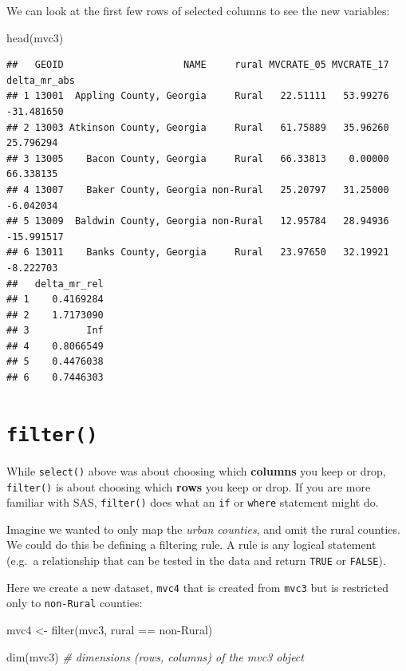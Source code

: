 \documentclass[
]{book}
\newenvironment{Shaded}{\begin{snugshade}}{\end{snugshade}}
\newcommand{\CommentTok}[1]{\textcolor[rgb]{0.56,0.35,0.01}{\textit{#1}}}
\newcommand{\FunctionTok}[1]{\textcolor[rgb]{0.00,0.00,0.00}{#1}}
\newcommand{\NormalTok}[1]{#1}
\newcommand{\OtherTok}[1]{\textcolor[rgb]{0.56,0.35,0.01}{#1}}
\newcommand{\SpecialCharTok}[1]{\textcolor[rgb]{0.00,0.00,0.00}{#1}}
\newcommand{\StringTok}[1]{\textcolor[rgb]{0.31,0.60,0.02}{#1}}
\begin{document}
We can look at the first few rows of selected columns to see the new variables:

\begin{Shaded}
\begin{Highlighting}[]
\FunctionTok{head}\NormalTok{(mvc3)}
\end{Highlighting}
\end{Shaded}

\begin{verbatim}
##   GEOID                     NAME     rural MVCRATE_05 MVCRATE_17 delta_mr_abs
## 1 13001  Appling County, Georgia     Rural   22.51111   53.99276   -31.481650
## 2 13003 Atkinson County, Georgia     Rural   61.75889   35.96260    25.796294
## 3 13005    Bacon County, Georgia     Rural   66.33813    0.00000    66.338135
## 4 13007    Baker County, Georgia non-Rural   25.20797   31.25000    -6.042034
## 5 13009  Baldwin County, Georgia non-Rural   12.95784   28.94936   -15.991517
## 6 13011    Banks County, Georgia     Rural   23.97650   32.19921    -8.222703
##   delta_mr_rel
## 1    0.4169284
## 2    1.7173090
## 3          Inf
## 4    0.8066549
## 5    0.4476038
## 6    0.7446303
\end{verbatim}

\hypertarget{filter}{%
\section{\texorpdfstring{\texttt{filter()}}{filter()}}\label{filter}}

While \texttt{select()} above was about choosing which \textbf{columns} you keep or drop, \texttt{filter()} is about choosing which \textbf{rows} you keep or drop. If you are more familiar with SAS, \texttt{filter()} does what an \texttt{if} or \texttt{where} statement might do.

Imagine we wanted to only map the \emph{urban counties}, and omit the rural counties. We could do this be defining a filtering rule. A rule is any logical statement (e.g.~a relationship that can be tested in the data and return \texttt{TRUE} or \texttt{FALSE}).

Here we create a new dataset, \texttt{mvc4} that is created from \texttt{mvc3} but is restricted only to \texttt{non-Rural} counties:

\begin{Shaded}
\begin{Highlighting}[]
\NormalTok{mvc4 }\OtherTok{\textless{}{-}} \FunctionTok{filter}\NormalTok{(mvc3, rural }\SpecialCharTok{==} \StringTok{\textquotesingle{}non{-}Rural\textquotesingle{}}\NormalTok{)}


\FunctionTok{dim}\NormalTok{(mvc3) }\CommentTok{\# dimensions (rows, columns) of the mvc3 object}
\end{Highlighting}
\end{Shaded}
\end{document}
